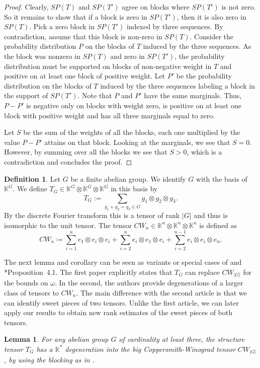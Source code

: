 \documentclass[a4paper,11pt,reqno]{amsart}
\newcommand{\bbK}{\mathbb{K}}
\numberwithin{equation}{section}
\theoremstyle{definition}
\newtheorem{defn}[equation]{Definition}
\theoremstyle{plain}
\newtheorem{lem}[defn]{Lemma}
\theoremstyle{remark}
\begin{document}
\begin{proof}
Clearly, $SP(T)$ and $SP(T')$ agree on blocks where $SP(T')$ is not zero. So it remains to show that if a block is zero in $SP(T')$, then it is also zero in $SP(T)$. Pick a zero block in $SP(T')$ indexed by three sequences. By contradiction, assume that this block is non-zero in $SP(T)$. Consider the probability distribution $P$ on the blocks of $T$ induced by the three sequences. As the block was nonzero in $SP(T)$ and zero in $SP(T')$, the probability distribution must be supported on blocks of non-negative weight in $T$ and positive on at least one block of positive weight. Let $P'$ be the probability distribution on the blocks of $T$ induced by the three sequences labeling a block in the support of $SP(T')$. Note that $P$ and $P'$ have the same marginals. Thus, $P-P'$ is negative only on blocks with weight zero, is positive on at least one block with positive weight and has all three marginals equal to zero.

Let $S$ be the sum of the weights of all the blocks, each one multiplied by the value $P-P'$ attains on that block. Looking at the marginals, we see that $S=0$. However, by summing over all the blocks we see that $S>0$, which is a contradiction and concludes the proof.
\end{proof}
\begin{defn}
    Let $G$ be a finite abelian group.
We identify $G$ with the basis of $\bbK^G$.
We define $T_G\in \bbK^G\otimes\bbK^G\otimes\bbK^G$ in this basis by
\[T_G:=\sum_{g_1+g_2=g_3\in G} g_1\otimes g_2\otimes g_3.\]
By the discrete Fourier transform this is a tensor of rank $|G|$ and thus is isomorphic to the unit tensor.
The tensor $CW_n\in \bbK^n\otimes\bbK^n\otimes\bbK^n$ is defined as
\[CW_n\coloneq \sum_{i=1}^n e_1\otimes e_i\otimes e_i+\sum_{i=2}^n e_i\otimes e_1\otimes e_i+\sum_{i=2}^{n-1} e_i\otimes e_i\otimes e_n.\]
\end{defn}
The next lemma and corollary can be seen as variants or special cases of \cite{alman2018further} and \cite{hoyois2021hermitian}*{Proposition~4.1}. The first paper explicitly states that $T_G$ can replace $CW_{|G|}$ for the bounds on $\omega$. In the second, the authors provide degenerations of a larger class of tensors to $CW_n$. The main difference with the second article is that we can identify sweet pieces of two tensors. Unlike the first article, we can later apply our results to obtain new rank estimates of the sweet pieces of both tensors.
\begin{lem}\label{lem:sweetCWnobrank}
For any abelian group $G$ of cardinality at least three, the structure tensor $T_G$ has a $\bbK^*$ degeneration into the big Coppersmith-Winograd tensor $CW_{|G|}$, by using the blocking as in \cite{CW}.
\end{lem}
\end{document}
